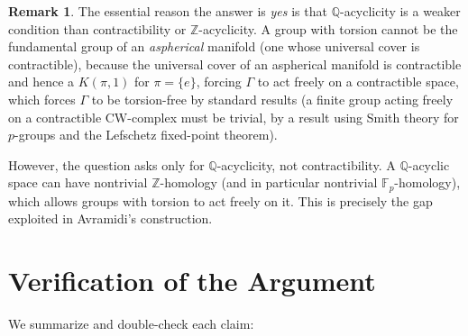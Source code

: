 \documentclass[12pt]{article}
\theoremstyle{definition}
\newtheorem{remark}[theorem]{Remark}
\begin{document}
\begin{remark}
The essential reason the answer is \emph{yes} is that $\mathbb{Q}$-acyclicity is a weaker
condition than contractibility or $\mathbb{Z}$-acyclicity.  A group with torsion cannot be
the fundamental group of an \emph{aspherical} manifold (one whose universal cover is
contractible), because the universal cover of an aspherical manifold is contractible and
hence a $K(\pi,1)$ for $\pi = \{e\}$, forcing $\Gamma$ to act freely on a contractible
space, which forces $\Gamma$ to be torsion-free by standard results (a finite group acting
freely on a contractible CW-complex must be trivial, by a result using Smith theory for
$p$-groups and the Lefschetz fixed-point theorem).

However, the question asks only for $\mathbb{Q}$-acyclicity, not contractibility.  A
$\mathbb{Q}$-acyclic space can have nontrivial $\mathbb{Z}$-homology (and in particular
nontrivial $\mathbb{F}_p$-homology), which allows groups with torsion to act freely on
it.  This is precisely the gap exploited in Avramidi's construction.
\end{remark}

\section{Verification of the Argument}

We summarize and double-check each claim:
\end{document}

